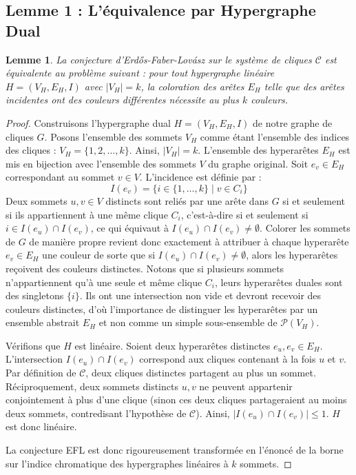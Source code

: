 \documentclass[12pt,a4paper]{article}
\newtheorem{lemma}{Lemme}
\begin{document}
\subsection{Lemme 1 : L'équivalence par Hypergraphe Dual}
\begin{lemma}
La conjecture d'Erdős-Faber-Lovász sur le système de cliques $\mathcal{C}$ est équivalente au problème suivant : pour tout hypergraphe linéaire $H = (V_H, E_H, I)$ avec $|V_H| = k$, la coloration des arêtes $E_H$ telle que des arêtes incidentes ont des couleurs différentes nécessite au plus $k$ couleurs.
\end{lemma}
\begin{proof}
Construisons l'hypergraphe dual $H = (V_H, E_H, I)$ de notre graphe de cliques $G$.
Posons l'ensemble des sommets $V_H$ comme étant l'ensemble des indices des cliques : $V_H = \{1, 2, \dots, k\}$. Ainsi, $|V_H| = k$.
L'ensemble des hyperarêtes $E_H$ est mis en bijection avec l'ensemble des sommets $V$ du graphe original. Soit $e_v \in E_H$ correspondant au sommet $v \in V$.
L'incidence est définie par :
$$ I(e_v) = \{ i \in \{1, \dots, k\} \mid v \in C_i \} $$
Deux sommets $u, v \in V$ distincts sont reliés par une arête dans $G$ si et seulement si ils appartiennent à une même clique $C_i$, c'est-à-dire si et seulement si $i \in I(e_u) \cap I(e_v)$, ce qui équivaut à $I(e_u) \cap I(e_v) \neq \emptyset$.
Colorer les sommets de $G$ de manière propre revient donc exactement à attribuer à chaque hyperarête $e_v \in E_H$ une couleur de sorte que si $I(e_u) \cap I(e_v) \neq \emptyset$, alors les hyperarêtes reçoivent des couleurs distinctes. Notons que si plusieurs sommets n'appartiennent qu'à une seule et même clique $C_i$, leurs hyperarêtes duales sont des singletons $\{i\}$. Ils ont une intersection non vide et devront recevoir des couleurs distinctes, d'où l'importance de distinguer les hyperarêtes par un ensemble abstrait $E_H$ et non comme un simple sous-ensemble de $\mathcal{P}(V_H)$.

Vérifions que $H$ est linéaire. Soient deux hyperarêtes distinctes $e_u, e_v \in E_H$. L'intersection $I(e_u) \cap I(e_v)$ correspond aux cliques contenant à la fois $u$ et $v$. Par définition de $\mathcal{C}$, deux cliques distinctes partagent au plus un sommet. Réciproquement, deux sommets distincts $u, v$ ne peuvent appartenir conjointement à plus d'une clique (sinon ces deux cliques partageraient au moins deux sommets, contredisant l'hypothèse de $\mathcal{C}$). Ainsi, $|I(e_u) \cap I(e_v)| \le 1$. $H$ est donc linéaire.

La conjecture EFL est donc rigoureusement transformée en l'énoncé de la borne sur l'indice chromatique des hypergraphes linéaires à $k$ sommets.
\end{proof}
\end{document}
